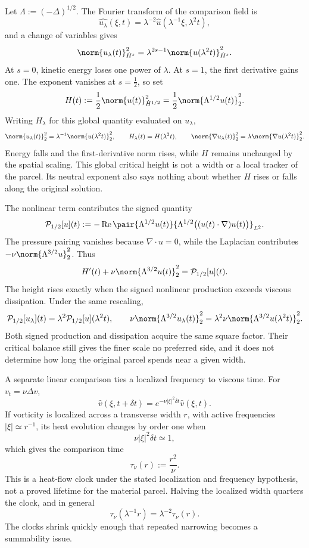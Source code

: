 Let \(\Lambda:=(-\Delta)^{1/2}\). The Fourier transform of the comparison field is
\[
  \widehat{u_\lambda}(\xi,t)
  =
  \lambda^{-2}\widehat u(\lambda^{-1}\xi,\lambda^2t),
\]
and a change of variables gives
\[
  \norm{u_\lambda(t)}_{\dot H^s}^2
  =
  \lambda^{2s-1}
  \norm{u(\lambda^2t)}_{\dot H^s}^2.
\]
At \(s=0\), kinetic energy loses one power of \(\lambda\). At \(s=1\), the first derivative gains one. The exponent vanishes at \(s=\tfrac12\), so set
\[
  H(t)
  :=
  \frac12\norm{u(t)}_{\dot H^{1/2}}^2
  =
  \frac12\norm{\Lambda^{1/2}u(t)}_2^2.
\]
Writing \(H_\lambda\) for this global quantity evaluated on \(u_\lambda\),
\[
  \norm{u_\lambda(t)}_2^2
  =
  \lambda^{-1}\norm{u(\lambda^2t)}_2^2,
  \qquad
  H_\lambda(t)=H(\lambda^2t),
  \qquad
  \norm{\nabla u_\lambda(t)}_2^2
  =
  \lambda\norm{\nabla u(\lambda^2t)}_2^2.
\]
Energy falls and the first-derivative norm rises, while \(H\) remains unchanged by the spatial scaling. This global critical height is not a width or a local tracker of the parcel. Its neutral exponent also says nothing about whether \(H\) rises or falls along the original solution.


The nonlinear term contributes the signed quantity
\[
  \mathcal P_{1/2}[u](t)
  :=
  -\operatorname{Re}
  \pair
    {\Lambda^{1/2}u(t)}
    {\Lambda^{1/2}\bigl((u(t)\cdot\nabla)u(t)\bigr)}_{L^2}.
\]
The pressure pairing vanishes because \(\nabla\cdot u=0\), while the Laplacian contributes \(-\nu\norm{\Lambda^{3/2}u}_2^2\). Thus
\[
  H'(t)
  +
  \nu\norm{\Lambda^{3/2}u(t)}_2^2
  =
  \mathcal P_{1/2}[u](t).
\]
The height rises exactly when the signed nonlinear production exceeds viscous dissipation. Under the same rescaling,
\[
  \mathcal P_{1/2}[u_\lambda](t)
  =
  \lambda^2\mathcal P_{1/2}[u](\lambda^2t),
  \qquad
  \nu\norm{\Lambda^{3/2}u_\lambda(t)}_2^2
  =
  \lambda^2\nu\norm{\Lambda^{3/2}u(\lambda^2t)}_2^2.
\]
Both signed production and dissipation acquire the same square factor. Their critical balance still gives the finer scale no preferred side, and it does not determine how long the original parcel spends near a given width.


A separate linear comparison ties a localized frequency to viscous time. For \(v_t=\nu\Delta v\),
\[
  \widehat v(\xi,t+\delta t)
  =
  e^{-\nu|\xi|^2\delta t}\widehat v(\xi,t).
\]
If vorticity is localized across a transverse width \(r\), with active frequencies \(|\xi|\simeq r^{-1}\), its heat evolution changes by order one when
\[
  \nu|\xi|^2\delta t\simeq1,
\]
which gives the comparison time
\[
  \tau_\nu(r)
  :=
  \frac{r^2}{\nu}.
\]
This is a heat-flow clock under the stated localization and frequency hypothesis, not a proved lifetime for the material parcel. Halving the localized width quarters the clock, and in general
\[
  \tau_\nu(\lambda^{-1}r)
  =
  \lambda^{-2}\tau_\nu(r).
\]
The clocks shrink quickly enough that repeated narrowing becomes a summability issue.

